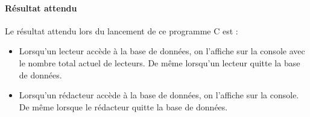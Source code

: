\documentclass[12pt]{article}
\begin{document}
\paragraph{Résultat attendu\\}
Le résultat attendu lors du lancement de ce programme C est :
\begin{itemize}
  \item Lorsqu'un lecteur accède à la base de données, on l'affiche sur la console avec le nombre total actuel de lecteurs. De même lorsqu'un lecteur quitte la base de données.
  \item Lorsqu'un rédacteur accède à la base de données, on l'affiche sur la console. De même lorsque le rédacteur quitte la base de données.
\end{itemize}
\end{document}
